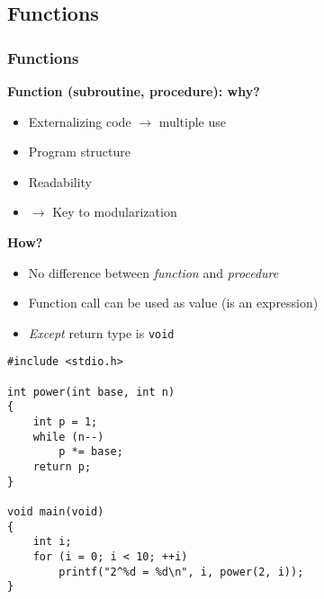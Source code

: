 \subsection{Functions}

\begin{frame}
  \frametitle{Functions}

  \textbf{Function (subroutine, procedure): why?}

  \begin{itemize}
  \item Externalizing code $\to$ multiple use
  \item Program structure
  \item Readability
  \item $\to$ Key to modularization
  \end{itemize}

  \textbf{How?}

  \begin{itemize}
  \item No difference between \textit{function} and \textit{procedure}
  \item Function call can be used as value (is an expression)
  \item \textit{Except} return type is \texttt{void}
  \end{itemize}
  
\end{frame}

\begin{frame}[fragile]

  \begin{block}{}
\begin{verbatim}
#include <stdio.h>

int power(int base, int n)
{
    int p = 1;
    while (n--)
        p *= base;
    return p;
}

void main(void)
{
    int i;
    for (i = 0; i < 10; ++i)
        printf("2^%d = %d\n", i, power(2, i));
}
\end{verbatim}
  \end{block}

\end{frame}

